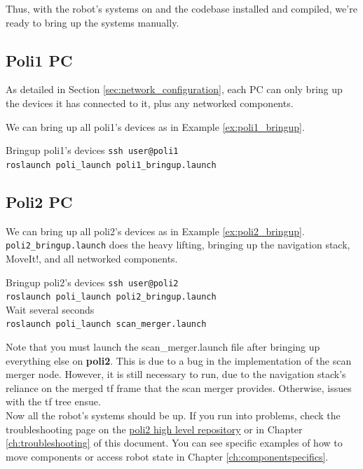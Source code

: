 Thus, with the robot's systems on and the codebase installed and compiled, we're ready to bring up the systems manually.

\subsection{Poli1 PC}
As detailed in Section \ref{sec:network_configuration}, each PC can only bring up the devices it has connected to it, plus any networked components. 

We can bring up all poli1's devices as in Example \ref{ex:poli1_bringup}.

\begin{example}{Bringup poli1's devices}
  \label{ex:poli1_bringup}
    \texttt{ssh user@poli1} \\
  \texttt{roslaunch poli\_launch poli1\_bringup.launch}
\end{example}

\subsection{Poli2 PC}
We can bring up all poli2's devices as in Example \ref{ex:poli2_bringup}.
\texttt{poli2\_bringup.launch} does the heavy lifting, bringing up the navigation stack, MoveIt!, and all networked components. \\

\begin{example}{Bringup poli2's devices}
  \label{ex:poli2_bringup}
  \texttt{ssh user@poli2} \\
  \texttt{roslaunch poli\_launch poli2\_bringup.launch} \\
  Wait several seconds \\
  \texttt{roslaunch poli\_launch scan\_merger.launch}
\end{example}

Note that you must launch the scan\_merger.launch file after bringing up everything else on \textbf{poli2}. 
This is due to a bug in the implementation of the scan merger node. 
However, it is still necessary to run, due to the navigation stack's reliance on the merged tf frame that the scan merger provides. Otherwise, issues with the tf tree ensue. \\

Now all the robot's systems should be up. If you run into problems, check the troubleshooting page on the \href{https://github.com/si-machines/poli2/wiki}{poli2 high level repository} or in Chapter \ref{ch:troubleshooting} of this document. You can see specific examples of how to move components or access robot state in Chapter \ref{ch:componentspecifics}.

